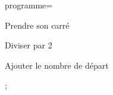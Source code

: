 \documentclass[exercice]{thedocument}%
\begin{document}
%
    \>programme={\item Prendre son carré\item Diviser par 2\item%
    Ajouter le nombre de départ};%
\end{document}

